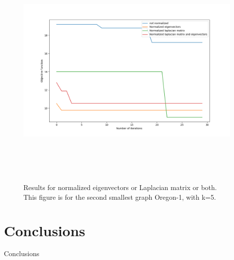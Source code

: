 \documentclass{article}
\begin{document}
\begin{figure}[htb]
\begin{center} 
\includegraphics[height=12cm]{normalization_plot-oregonk5.png}
\end{center}
\caption{Results for normalized eigenvectors or Laplacian matrix or both.
This figure is for the second smallest graph Oregon-1, with k=5.}
\label{normalized2}
\end{figure}

\clearpage
\section{Conclusions}

Conclusions
\end{document}
